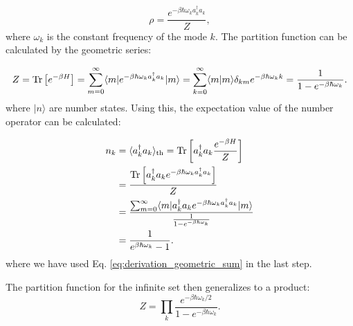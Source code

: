 \begin{equation} \label{eq:single_mode_density_matrix}
	\rho = \frac{e^{-\beta \hbar \omega_k a_k^{\dagger} a_k}}{Z},
\end{equation}
where \( \omega_k \) is the constant frequency of the mode \( k \).
The partition function can be calculated by the geometric series:

\begin{equation} \label{eq:partition_function}
	Z = \Tr\left[e^{-\beta H}\right] = \sum_{m=0}^{\infty} \langle m | e^{-\beta \hbar \omega_k a_k^{\dagger} a_k} | m \rangle
	= \sum_{k=0}^{\infty} \langle m | m \rangle \delta_{km} e^{-\beta \hbar \omega_k k} \\
	= \frac{1}{1 - e^{-\beta \hbar \omega_k}}. %
\end{equation}
where \(|n\rangle\) are number states.
Using this, the expectation value of the number operator can be calculated:

\begin{align} \label{eq:expectation_number_operator}
	n_k & = \langle a_k^{\dagger} a_k \rangle_{\text{th}} = \mathrm{Tr} \left[ a_k^{\dagger} a_k \frac{e^{-\beta H}}{Z} \right]                                           \\
	    & = \frac{\mathrm{Tr} \left[ a_k^{\dagger} a_k e^{-\beta \hbar \omega_k a_k^{\dagger} a_k} \right]}{Z}                                                            \\
	    & = \frac{\sum_{m=0}^{\infty} \langle m|a_k^{\dagger} a_k e^{-\beta \hbar \omega_k a_k^{\dagger} a_k}|m \rangle}{\frac{1}{1 - e^{-\beta \hbar \omega_k}}} \\
	    & = \frac{1}{e^{\beta \hbar \omega_k} - 1}.
\end{align}
where we have used Eq. \eqref{eq:derivation_geometric_sum} in the last step.

The partition function for the infinite set then generalizes to a product:
\begin{equation} \label{eq:generalized_partition_function}
	Z = \prod_k \frac{e^{-\beta \hbar \omega_k / 2}}{1 - e^{-\beta \hbar \omega_k}}.
\end{equation}

